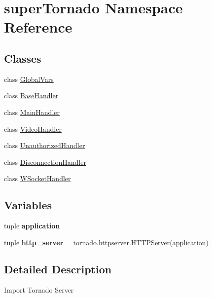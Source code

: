 \hypertarget{namespacesuper_tornado}{\section{super\-Tornado Namespace Reference}
\label{namespacesuper_tornado}
}
\subsection*{Classes}
\begin{DoxyCompactItemize}
\item 
class \hyperlink{classsuper_tornado_1_1_global_vars}{Global\-Vars}
\item 
class \hyperlink{classsuper_tornado_1_1_base_handler}{Base\-Handler}
\item 
class \hyperlink{classsuper_tornado_1_1_main_handler}{Main\-Handler}
\item 
class \hyperlink{classsuper_tornado_1_1_video_handler}{Video\-Handler}
\item 
class \hyperlink{classsuper_tornado_1_1_unauthorized_handler}{Unauthorized\-Handler}
\item 
class \hyperlink{classsuper_tornado_1_1_disconnection_handler}{Disconnection\-Handler}
\item 
class \hyperlink{classsuper_tornado_1_1_w_socket_handler}{W\-Socket\-Handler}
\end{DoxyCompactItemize}
\subsection*{Variables}
\begin{DoxyCompactItemize}
\item 
tuple {\bfseries application}
\item 
\hypertarget{namespacesuper_tornado_acc65a75d3941165f9c5e66f6af6bd32f}{tuple {\bfseries http\-\_\-server} = tornado.\-httpserver.\-H\-T\-T\-P\-Server(application)}\label{namespacesuper_tornado_acc65a75d3941165f9c5e66f6af6bd32f}

\end{DoxyCompactItemize}


\subsection{Detailed Description}
\begin{DoxyVerb}Import Tornado Server\end{DoxyVerb}
 

